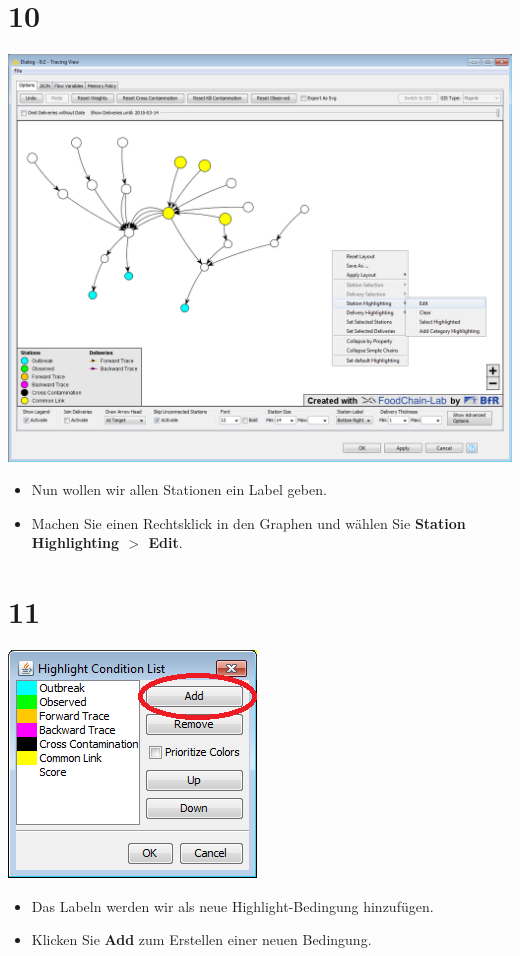 \documentclass{beamer}
\begin{document}
\section{10}
\begin{frame}
	\begin{center}
  		\includegraphics[height=0.6\textheight]{10.png}
	\end{center}
	\begin{itemize}
		\item Nun wollen wir allen Stationen ein Label geben.
		\item Machen Sie einen Rechtsklick in den Graphen und wählen Sie \textbf{Station Highlighting $>$ Edit}.
	\end{itemize}
\end{frame}

\section{11}
\begin{frame}
	\begin{center}
  		\includegraphics[height=0.6\textheight]{11.png}
	\end{center}
	\begin{itemize}
		\item Das Labeln werden wir als neue Highlight-Bedingung hinzufügen.
		\item Klicken Sie \textbf{Add} zum Erstellen einer neuen Bedingung.
	\end{itemize}
\end{frame}
\end{document}
